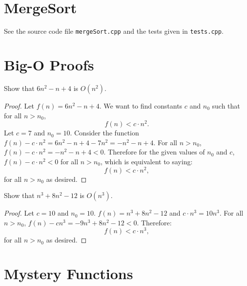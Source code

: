 \documentclass{article}
\begin{document}
    \section{MergeSort}

    See the source code file \texttt{mergeSort.cpp} and the tests given in
    \texttt{tests.cpp}.

    \section{Big-O Proofs}
	
    \vspace{2mm}
     Show that $6n^2−n+4$ is $O(n^2)$.

    \begin{proof}
    	Let $f(n) = 6n^2 - n + 4$. We want to find constants $c$ and $n_0$ such that for all $n>n_0$, 
    	\begin{equation*}
    	f(n) < c \cdot n^2.
    	\end{equation*}
    	Let $c = 7$ and $n_0 = 10$. Consider the function $f(n) - c \cdot n^2 =6n^2 - n + 4 - 7n^2 =  -n^2 - n + 4.$ For all $n>n_0$, $f(n) - c \cdot n^2 = -n^2 - n + 4<0$. Therefore for the given values of $n_0$ and $c$, $f(n) - c \cdot n^2 < 0$ for all $n> n_0$, which is equivalent to saying:
    	\begin{equation}
    	f(n) < c \cdot n^2,
    	\end{equation}
    	for all $n>n_0$ as desired. 
    \end{proof}

    \vspace{1cm}
     Show that $n^3 + 8n^2 - 12$ is $O(n^3)$.
	\begin{proof}
		Let $c=10$ and $n_0=10$. $f(n) = n^3 + 8n^2 -12$ and $c \cdot n^3 = 10n^3$. For all $n>n_0$, $f(n) - cn^3 = -9n^3 + 8n^2 -12 < 0$. Therefore:
		\begin{equation}
		f(n) < c \cdot n^3,
		\end{equation}
		for all $n>n_0$ as desired.
	\end{proof}

    \vspace{1cm}
    \newpage
    \section{Mystery Functions}

    
\end{document}
